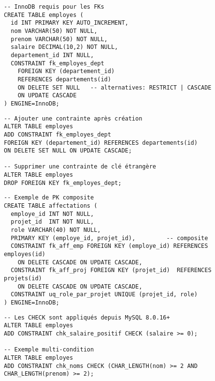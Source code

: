 \documentclass[a4paper,11pt]{article}
\begin{document}
\begin{tcolorbox}[colback=green!5!white,colframe=green!75!black,title=Clés étrangères (FOREIGN KEY) avec actions]
\begin{verbatim}
-- InnoDB requis pour les FKs
CREATE TABLE employes (
  id INT PRIMARY KEY AUTO_INCREMENT,
  nom VARCHAR(50) NOT NULL,
  prenom VARCHAR(50) NOT NULL,
  salaire DECIMAL(10,2) NOT NULL,
  departement_id INT NULL,
  CONSTRAINT fk_employes_dept
    FOREIGN KEY (departement_id)
    REFERENCES departements(id)
    ON DELETE SET NULL   -- alternatives: RESTRICT | CASCADE
    ON UPDATE CASCADE
) ENGINE=InnoDB;
\end{verbatim}

\begin{verbatim}
-- Ajouter une contrainte après création
ALTER TABLE employes
ADD CONSTRAINT fk_employes_dept
FOREIGN KEY (departement_id) REFERENCES departements(id)
ON DELETE SET NULL ON UPDATE CASCADE;

-- Supprimer une contrainte de clé étrangère
ALTER TABLE employes
DROP FOREIGN KEY fk_employes_dept;
\end{verbatim}
\end{tcolorbox}

\begin{tcolorbox}[colback=yellow!5!white,colframe=yellow!75!black,title=Clés primaires composées et contraintes composées]
\begin{verbatim}
-- Exemple de PK composite
CREATE TABLE affectations (
  employe_id INT NOT NULL,
  projet_id  INT NOT NULL,
  role VARCHAR(40) NOT NULL,
  PRIMARY KEY (employe_id, projet_id),         -- composite
  CONSTRAINT fk_aff_emp FOREIGN KEY (employe_id) REFERENCES employes(id)
    ON DELETE CASCADE ON UPDATE CASCADE,
  CONSTRAINT fk_aff_proj FOREIGN KEY (projet_id)  REFERENCES projets(id)
    ON DELETE CASCADE ON UPDATE CASCADE,
  CONSTRAINT uq_role_par_projet UNIQUE (projet_id, role)
) ENGINE=InnoDB;
\end{verbatim}
\end{tcolorbox}

\begin{tcolorbox}[colback=orange!5!white,colframe=orange!75!black,title=CHECK (MySQL 8.0+)]
\begin{verbatim}
-- Les CHECK sont appliqués depuis MySQL 8.0.16+
ALTER TABLE employes
ADD CONSTRAINT chk_salaire_positif CHECK (salaire >= 0);

-- Exemple multi-condition
ALTER TABLE employes
ADD CONSTRAINT chk_noms CHECK (CHAR_LENGTH(nom) >= 2 AND CHAR_LENGTH(prenom) >= 2);
\end{verbatim}
\end{tcolorbox}
\end{document}
